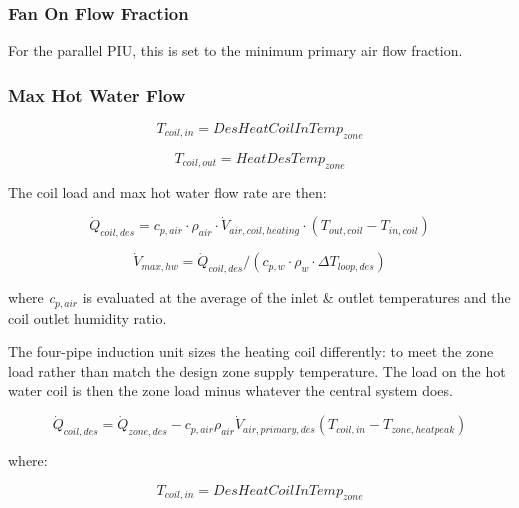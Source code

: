 \subsubsection{Fan On Flow Fraction}\label{fan-on-flow-fraction}

For the parallel PIU, this is set to the minimum primary air flow fraction.

\subsubsection{Max Hot Water Flow}\label{max-hot-water-flow}

\begin{equation}
{T_{coil,in}} = DesHeatCoilInTem{p_{zone}}
\end{equation}

\begin{equation}
{T_{coil,out}} = HeatDesTem{p_{zone}}
\end{equation}

The coil load and max hot water flow rate are then:

\begin{equation}
  \dot Q_{coil,des} = c_{p,air}\cdot \rho_{air}\cdot \dot V_{air,coil,heating}\cdot (T_{out,coil} - T_{in,coil})
\end{equation}

\begin{equation}
  \dot V_{max,hw} = \dot Q_{coil,des}/(c_{p,w}\cdot \rho_{w}\cdot \Delta T_{loop,des})
\end{equation}

where \emph{c\(_{p,air}\)} is evaluated at the average of the inlet \& outlet temperatures and the coil outlet humidity ratio.

The four-pipe induction unit sizes the heating coil differently: to meet the zone load rather than match the design zone supply temperature. The load on the hot water coil is then the zone load minus whatever the central system does.

\begin{equation}
{\dot Q_{coil,des}} = {\dot Q_{zone,des}} - {c_{p,air}}{\rho_{air}}{\dot V_{air,primary,des}}({T_{coil,in}} - {T_{zone,heatpeak}})
\end{equation}

where:

\begin{equation}
{T_{coil,in}} = DesHeatCoilInTem{p_{zone}}
\end{equation}

